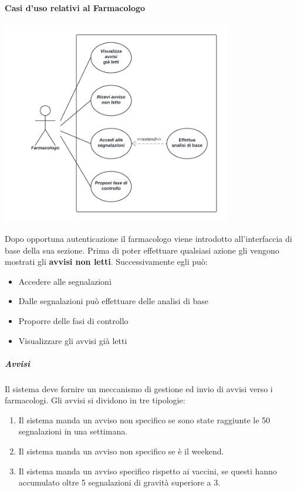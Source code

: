 \documentclass[11pt]{article}
\begin{document}
        \paragraph*{Casi d'uso relativi al Farmacologo}
                \begin{center}
                    \includegraphics[width=0.75\textwidth]{pictures/CasoDUsoFarmacologo.png}
                \end{center}
            Dopo opportuna autenticazione il farmacologo viene introdotto all'interfaccia di base della sua sezione. Prima di poter effettuare qualsiasi azione gli vengono mostrati gli \textbf{avvisi non letti}. Successivamente egli può:
                \begin{itemize}
                    \item Accedere alle segnalazioni
                    \item Dalle segnalazioni può effettuare delle analisi di base
                    \item Proporre delle fasi di controllo
                    \item Visualizzare gli avvisi già letti
                \end{itemize}
            \subparagraph*{Avvisi}
                Il sistema deve fornire un meccanismo di gestione ed invio di avvisi verso i
                farmacologi. Gli avvisi si dividono in tre tipologie:
                    \begin{enumerate}
                        \item Il sistema manda un avviso non specifico se sono state raggiunte le 50 segnalazioni in una settimana.
                        \item Il sistema manda un avviso non specifico se è il weekend.
                        \item Il sistema manda un avviso specifico rispetto ai vaccini, se questi hanno accumulato oltre 5 segnalazioni di gravità superiore a 3.
                    \end{enumerate}
\end{document}
